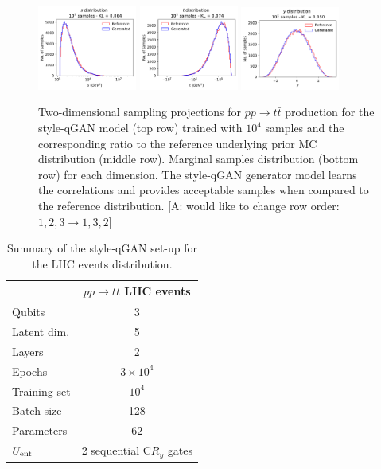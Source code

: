 \documentclass[twocolumn,preprintnumbers,superscriptaddress]{revtex4-2}
\newcommand{\commentAF}[1]{{\color{cyan} {[A: #1]}}}
\begin{document}
\begin{figure}
  \includegraphics[width=0.29\textwidth]{plots/LHCttbar/s-distribution_LHCdata_100k.pdf}%
  \includegraphics[width=0.29\textwidth]{plots/LHCttbar/t-distribution_LHCdata_100k.pdf}%
  \includegraphics[width=0.29\textwidth]{plots/LHCttbar/y-distribution_LHCdata_100k.pdf}

  \caption{\label{fig:ttbar}Two-dimensional sampling projections for $pp
  \rightarrow t\bar{t}$ production for the style-qGAN model (top row) trained
  with $10^4$ samples and the corresponding ratio to the reference underlying
  prior MC distribution (middle row). Marginal samples distribution (bottom row)
  for each dimension. The style-qGAN generator model learns the correlations and
  provides acceptable samples when compared to the reference distribution.
  \commentAF{would like to change row order: $1,2,3 \rightarrow 1,3,2$}}
\end{figure}

\begin{table}
  \begin{tabular}{l|c}
     & {\bf $pp \rightarrow t\bar{t}$ LHC events} \tabularnewline
    \hline
    Qubits & 3  \tabularnewline
    Latent dim. & 5 \tabularnewline
    Layers & 2  \tabularnewline
    Epochs & $3\times10^4$ \tabularnewline
    Training set & $10^4$ \tabularnewline
    Batch size & 128 \tabularnewline
    Parameters & 62 \tabularnewline
    $U_{\rm ent}$ & 2 sequential C$R_y$ gates \tabularnewline
    \hline
  \end{tabular}

  \caption{\label{table:summary_lhc} Summary of the style-qGAN set-up for the LHC events distribution.}
\end{table}
\end{document}
